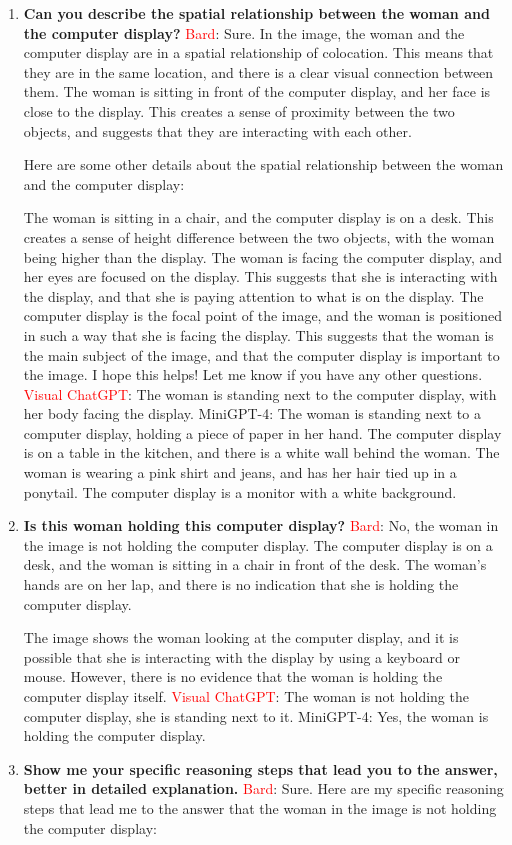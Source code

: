     \begin{enumerate}
        \item \textbf{Can you describe the spatial relationship between the woman and the computer display?}
        \subitem \textcolor{Red}{Bard}: 
        Sure. In the image, the woman and the computer display are in a spatial relationship of colocation. This means that they are in the same location, and there is a clear visual connection between them. The woman is sitting in front of the computer display, and her face is close to the display. This creates a sense of proximity between the two objects, and suggests that they are interacting with each other.

        Here are some other details about the spatial relationship between the woman and the computer display:

        The woman is sitting in a chair, and the computer display is on a desk. This creates a sense of height difference between the two objects, with the woman being higher than the display.
        The woman is facing the computer display, and her eyes are focused on the display. This suggests that she is interacting with the display, and that she is paying attention to what is on the display.
        The computer display is the focal point of the image, and the woman is positioned in such a way that she is facing the display. This suggests that the woman is the main subject of the image, and that the computer display is important to the image.
        I hope this helps! Let me know if you have any other questions.
        \subitem \textcolor{red}{Visual ChatGPT}: The woman is standing next to the computer display, with her body facing the display.
        \subitem MiniGPT-4: The woman is standing next to a computer display, holding a piece of paper in her hand. The computer display is on a table in the kitchen, and there is a white wall behind the woman. The woman is wearing a pink shirt and jeans, and has her hair tied up in a ponytail. The computer display is a monitor with a white background.
        \item \textbf{Is this woman holding this computer display?}
        \subitem \textcolor{Red}{Bard}: 
        No, the woman in the image is not holding the computer display. The computer display is on a desk, and the woman is sitting in a chair in front of the desk. The woman's hands are on her lap, and there is no indication that she is holding the computer display.
        
        The image shows the woman looking at the computer display, and it is possible that she is interacting with the display by using a keyboard or mouse. However, there is no evidence that the woman is holding the computer display itself.  
        \subitem \textcolor{red}{Visual ChatGPT}: The woman is not holding the computer display, she is standing next to it.
        \subitem MiniGPT-4: Yes, the woman is holding the computer display.    
        \item \textbf{Show me your specific reasoning steps that lead you to the answer, better in detailed explanation.}
        \subitem \textcolor{Red}{Bard}: Sure. Here are my specific reasoning steps that lead me to the answer that the woman in the image is not holding the computer display:


\end{enumerate}
